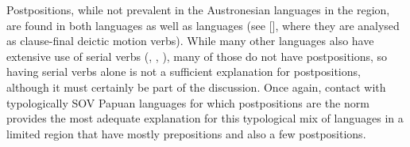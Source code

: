 Postpositions, while not prevalent in the Austronesian languages
in the region, are found in both 
languages as well as 
languages (see \citeauthor{Fricke2019} [\citeyear[44ff]{Fricke2019}], where they
are analysed as clause-final deictic motion verbs).
While many other  languages also have extensive
use of serial verbs
(\citealp{JacobGrimes2011}, \citealp[311--319]{Edwards2020}, \citealp[413--439]{Tamelan2021}),
many of those do not have postpositions,
so having serial verbs alone is not a sufficient explanation
for postpositions, although it must certainly be part of the discussion.
Once again, contact with typologically SOV Papuan languages for
which postpositions are the norm \citep{Klamer2017} provides
the most adequate explanation for this typological mix of languages
in a limited region that have mostly prepositions
and also a few postpositions.